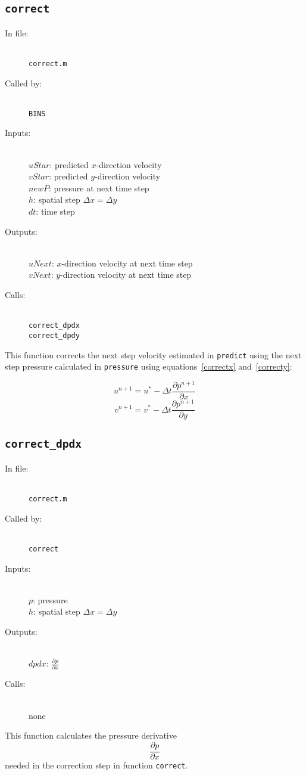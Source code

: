 \documentclass[12pt]{article}
\begin{document}
\subsection{\texttt{correct}}
\begin{description}
\item[In file:] \hfill \\ \texttt{correct.m}
\item[Called by:] \hfill \\ \texttt{BINS}
\item[Inputs:] \hfill \\ $uStar$: predicted $x$-direction velocity \\ $vStar$: predicted $y$-direction velocity \\ $newP$: pressure at next time step \\ $h$: spatial step $\Delta x = \Delta y$ \\ $dt$: time step
\item[Outputs:] \hfill \\ $uNext$: $x$-direction velocity at next time step \\ $vNext$: $y$-direction velocity at next time step
\item[Calls:] \hfill \\ \texttt{correct\_dpdx} \\ \texttt{correct\_dpdy}
\end{description}
This function corrects the next step velocity estimated in \texttt{predict} using the next step pressure calculated in \texttt{pressure} using equations~\ref{correctx} and~\ref{correcty}:

\[ u^{n+1}= u^* - \Delta t\frac{\partial p^{n+1}}{\partial x} \]
\[ v^{n+1}= v^* - \Delta t\frac{\partial p^{n+1}}{\partial y} \]

\subsection{\texttt{correct\_dpdx}}
\begin{description}
\item[In file:] \hfill \\ \texttt{correct.m}
\item[Called by:] \hfill \\ \texttt{correct}
\item[Inputs:] \hfill \\ $p$: pressure \\ $h$: spatial step $\Delta x = \Delta y$
\item[Outputs:] \hfill \\ $dpdx$: $\frac{\partial p}{\partial x}$
\item[Calls:] \hfill \\ none
\end{description}
This function calculates the pressure derivative
\[ \frac{\partial p}{\partial x}\]
needed in the correction step in function \texttt{correct}.
\end{document}
